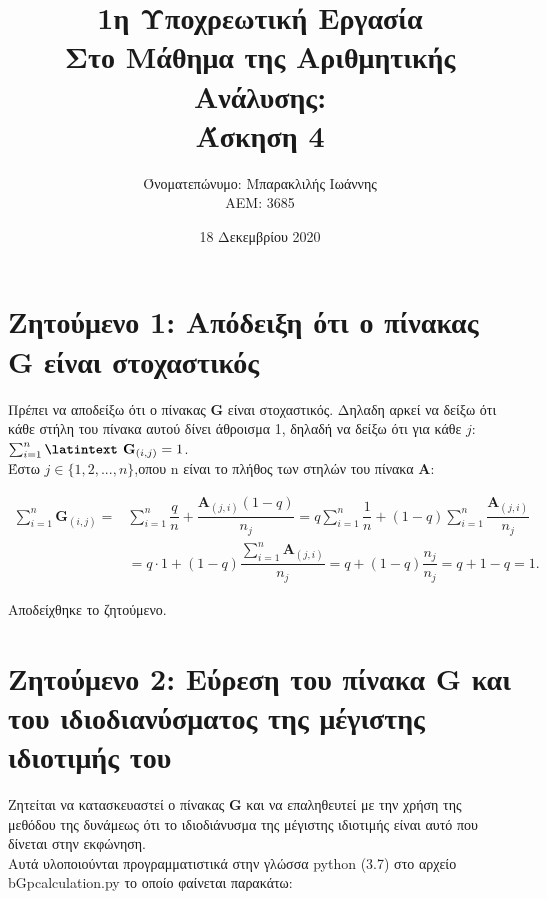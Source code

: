 \documentclass[a4paper,11pt]{article}
\title{1η Υποχρεωτική Εργασία \\ Στο Μάθημα της Αριθμητικής Ανάλυσης: \\ Άσκηση 4}
\author{Όνοματεπώνυμο: Μπαρακλιλής Ιωάννης  \\  ΑΕΜ: 3685}
\date{18 Δεκεμβρίου 2020}
\newcommand{\lt}{\latintext}
\newcommand{\gt}{\greektext}
\begin{document}
\maketitle

\section*{Ζητούμενο 1: Απόδειξη ότι ο πίνακας {\lt G} είναι στοχαστικός}

Πρέπει να αποδείξω ότι ο πίνακας {\lt \textbf{G}} είναι στοχαστικός. Δηλαδη αρκεί να δείξω ότι κάθε στήλη του πίνακα αυτού δίνει άθροισμα 1, δηλαδή να δείξω ότι για κάθε $j$: $\sum_{i=1}^{n} \textbf{{\lt G}}_{(i,j)} = 1$.\\

Έστω \lt $j \in \{1, 2, ..., n\}$,\gt  οπου {\lt n} είναι το πλήθος των στηλών του πίνακα {\lt \textbf{A}}:

\lt

\begin{equation*}
\begin{split}
    \sum_{i=1}^{n} \textbf{G}_{(i,j)} =
    & \sum_{i=1}^{n} \dfrac{q}{n} + \dfrac{\textbf{A}_{(j,i)}(1-q)}{n_j} =
    q\sum_{i=1}^{n} \dfrac{1}{n} + (1-q)\sum_{i=1}^{n} \dfrac{\textbf{A}_{(j,i)}}{n_j} \\
    & = q\cdot 1 + (1 - q)\dfrac{\sum_{i=1}^{n}\textbf{A}_{(j,i)}}{n_j}=
    q + (1 - q)\dfrac{n_j}{n_j} =
    q + 1 - q = 1.
\end{split}
\end{equation*}


\gt Αποδείχθηκε το ζητούμενο.

\section*{Ζητούμενο 2: Εύρεση του πίνακα {\lt G} και του ιδιοδιανύσματος της μέγιστης ιδιοτιμής του}
Ζητείται να κατασκευαστεί ο πίνακας \textbf{\lt G} και να επαληθευτεί με την χρήση της μεθόδου της δυνάμεως ότι το ιδιοδιάνυσμα της μέγιστης ιδιοτιμής είναι αυτό που δίνεται στην εκφώνηση.\\

Αυτά υλοποιούνται προγραμματιστικά στην γλώσσα {\lt python} (3.7) στο αρχείο {\lt b\textunderscore G\textunderscore p\textunderscore calculation.py}  το οποίο φαίνεται παρακάτω:\\


\lt

\gt
\end{document}
